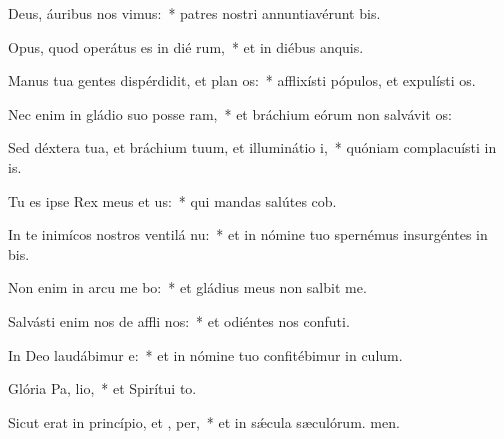 \item Deus, áuribus nos vimus:~* patres nostri annuntiavérunt bis.
\item Opus, quod operátus es in dié rum,~* et in diébus anquis.
\item Manus tua gentes dispérdidit, et plan os:~* afflixísti pópulos, et expulísti os.
\item Nec enim in gládio suo posse ram,~* et bráchium eórum non salvávit os:
\item Sed déxtera tua, et bráchium tuum, et illuminátio  i,~* quóniam complacuísti in is.
\item Tu es ipse Rex meus et  us:~* qui mandas salútes cob.
\item In te inimícos nostros ventilá nu:~* et in nómine tuo spernémus insurgéntes in bis.
\item Non enim in arcu me bo:~* et gládius meus non salbit me.
\item Salvásti enim nos de affli nos:~* et odiéntes nos confuti.
\item In Deo laudábimur  e:~* et in nómine tuo confitébimur in culum.
\item Glória Pa,  lio,~* et Spirítui to.
\item Sicut erat in princípio, et ,  per,~* et in sǽcula sæculórum. men.
